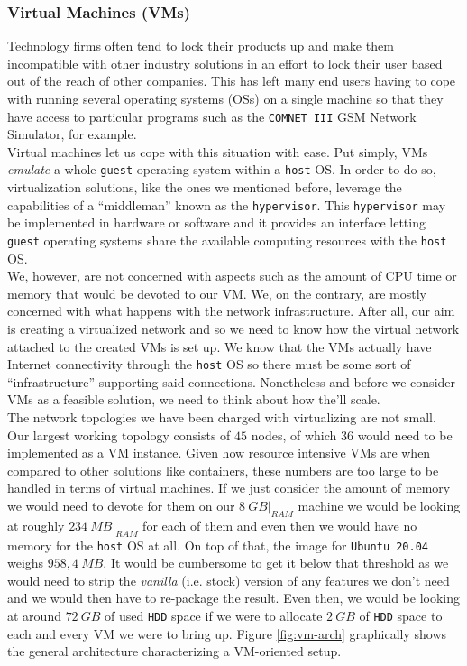             \subsubsection{Virtual Machines (VMs)}
                Technology firms often tend to lock their products up and make them incompatible with other industry solutions in an effort to lock their user based out of the reach of other companies. This has left many end users having to cope with running several operating systems (OSs) on a single machine so that they have access to particular programs such as the \texttt{COMNET III} GSM Network Simulator, for example.\\

                Virtual machines let us cope with this situation with ease. Put simply, VMs \textit{emulate} a whole \texttt{guest} operating system within a \texttt{host} OS. In order to do so, virtualization solutions, like the ones we mentioned before, leverage the capabilities of a ``middleman'' known as the \texttt{hypervisor}. This \texttt{hypervisor} may be implemented in hardware or software and it provides an interface letting \texttt{guest} operating systems share the available computing resources with the \texttt{host} OS.\\

                We, however, are not concerned with aspects such as the amount of CPU time or memory that would be devoted to our VM. We, on the contrary, are mostly concerned with what happens with the network infrastructure. After all, our aim is creating a virtualized network and so we need to know how the virtual network attached to the created VMs is set up. We know that the VMs actually have Internet connectivity through the \texttt{host} OS so there must be some sort of ``infrastructure'' supporting said connections. Nonetheless and before we consider VMs as a feasible solution, we need to think about how the'll scale.\\

                The network topologies we have been charged with virtualizing are not small. Our largest working topology consists of $45$ nodes, of which $36$ would need to be implemented as a VM instance. Given how resource intensive VMs are when compared to other solutions like containers, these numbers are too large to be handled in terms of virtual machines. If we just consider the amount of memory we would need to devote for them on our $8\ GB\rvert_{RAM}$ machine we would be looking at roughly $234\ MB\rvert_{RAM}$ for each of them and even then we would have no memory for the \texttt{host} OS at all. On top of that, the image for \texttt{Ubuntu 20.04} weighs $958,4\ MB$. It would be cumbersome to get it below that threshold as we would need to strip the \textit{vanilla} (i.e. stock) version of any features we don't need and we would then have to re-package the result. Even then, we would be looking at around $72\ GB$ of used \texttt{HDD} space if we were to allocate $2\ GB$ of \texttt{HDD} space to each and every VM we were to bring up. Figure \ref{fig:vm-arch} graphically shows the general architecture characterizing a VM-oriented setup.\\

